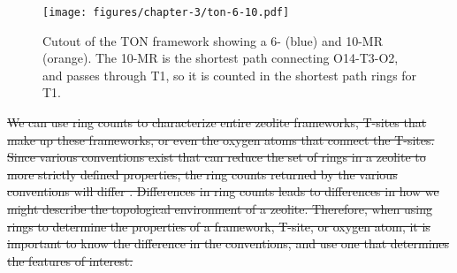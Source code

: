 \documentclass[preprint,numrefs,noinfo,sort&compress]{elsarticle}
\providecommand{\DIFdel}[1]{{\protect\color{red}\sout{#1}}}                      %
\providecommand{\DIFdelbegin}{} %
\providecommand{\DIFdelend}{} %
\providecommand{\DIFaddbeginFL}{} %
\providecommand{\DIFaddendFL}{} %
\providecommand{\DIFdelbeginFL}{} %
\providecommand{\DIFdelendFL}{} %
\newcommand{\DIFscaledelfig}{0.5}
\newlength{\DIFdelgraphicswidth} %
\newlength{\DIFdelgraphicsheight} %
\newcommand{\DIFaddincludegraphics}[2][]{{\color{blue}\fbox{\DIFOincludegraphics[#1]{#2}}}} %
\newcommand{\DIFdelincludegraphics}[2][]{%
\sbox{\DIFdelgraphicsbox}{\DIFOincludegraphics[#1]{#2}}%
\settoboxwidth{\DIFdelgraphicswidth}{\DIFdelgraphicsbox} %
\settoboxtotalheight{\DIFdelgraphicsheight}{\DIFdelgraphicsbox} %
\scalebox{\DIFscaledelfig}{%
\parbox[b]{\DIFdelgraphicswidth}{\usebox{\DIFdelgraphicsbox}\\[-\baselineskip] \rule{\DIFdelgraphicswidth}{0em}}\llap{\resizebox{\DIFdelgraphicswidth}{\DIFdelgraphicsheight}{%
\setlength{\unitlength}{\DIFdelgraphicswidth}%
\begin{picture}(1,1)%
\thicklines\linethickness{2pt} %
{\color[rgb]{1,0,0}\put(0,0){\framebox(1,1){}}}%
{\color[rgb]{1,0,0}\put(0,0){\line( 1,1){1}}}%
{\color[rgb]{1,0,0}\put(0,1){\line(1,-1){1}}}%
\end{picture}%
}\hspace*{3pt}}} %
} %
\DeclareRobustCommand{\DIFdelbegin}{\DIFOdelbegin \let\includegraphics\DIFdelincludegraphics} %
\DeclareRobustCommand{\DIFdelend}{\DIFOaddend \let\includegraphics\DIFOincludegraphics} %
\DeclareRobustCommand{\DIFaddbeginFL}{\DIFOaddbeginFL \let\includegraphics\DIFaddincludegraphics} %
\DeclareRobustCommand{\DIFaddendFL}{\DIFOaddendFL \let\includegraphics\DIFOincludegraphics} %
\DeclareRobustCommand{\DIFdelbeginFL}{\DIFOdelbeginFL \let\includegraphics\DIFdelincludegraphics} %
\DeclareRobustCommand{\DIFdelendFL}{\DIFOaddendFL \let\includegraphics\DIFOincludegraphics} %
\begin{document}
\DIFdelbegin %
\DIFdelendFL %
\DIFaddbeginFL 

\begin{figure}[t]
\DIFaddendFL \centering
\DIFdelbeginFL %
\DIFdelendFL \DIFaddbeginFL \texttt{[image: figures/chapter-3/ton-6-10.pdf]}
\DIFaddendFL \caption{Cutout of the TON framework showing a 6- (blue) and 10-MR (orange). The 10-MR is the shortest path connecting O14-T3-O2, and passes through T1, so it is counted in the shortest path rings for T1. \label{fig:3.4}}
\end{figure}
\DIFdelbegin %
\DIFdelend 


\DIFdelbegin \DIFdel{We can use ring counts to characterize entire zeolite frameworks, T-sites that make up these frameworks, or even the oxygen atoms that connect the T-sites. Since various conventions exist that can reduce the set of rings in a zeolite to more strictly defined properties, the ring counts returned by the various conventions will differ . Differences in ring counts leads to differences in how we might describe the topological environment of a zeolite. Therefore, when using rings to determine the properties of a framework, T-site, or oxygen atom, it is important to know the difference in the conventions, and use one that determines the features of interest. }%
\end{document}
